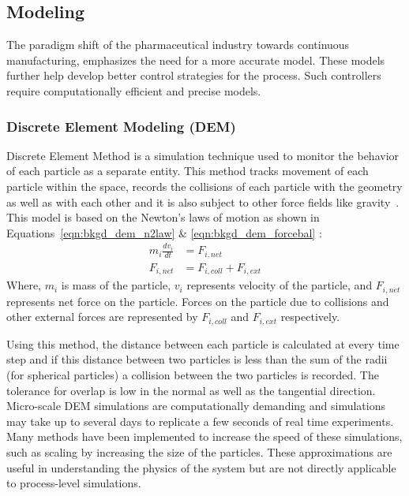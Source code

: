 \documentclass[preprint,11pt,authoryear]{elsarticle}
\begin{document}
\subsection{Modeling}
The paradigm shift of the pharmaceutical industry towards continuous 
manufacturing, emphasizes the need for a more accurate model. These models
further help develop better control strategies for the process. 
Such controllers require computationally efficient and precise models. 

\subsubsection{Discrete Element Modeling (DEM)}
Discrete Element Method is a simulation technique used to monitor the
behavior of each particle as a separate entity. This method tracks 
movement of each particle within the space, records the collisions 
of each particle with the geometry as well as with each other and it 
is also subject to other force fields like  gravity~\citep{Barrasso2015cerd}. 
This model is based on the Newton's laws of motion as shown in Equations~\ref{eqn:bkgd_dem_n2law} \&
\ref{eqn:bkgd_dem_forcebal} : \\
\begin{align}
m_i\frac{dv_i}{dt} &= F_{i,net} \label{eqn:bkgd_dem_n2law} \\
F_{i,net} &=  F_{i,coll} +  F_{i,ext} \label{eqn:bkgd_dem_forcebal}
\end{align}
Where, $m_i$ is mass of the particle, $v_i$ represents velocity of the
particle, and $F_{i,net}$ represents net force on the particle. Forces on the
particle due to collisions and other external forces are represented by
$F_{i,coll}$ and $F_{i,ext}$ respectively.

Using this method, the distance between each particle is calculated at every
time step and if this distance between two particles is less than the sum of
the radii (for spherical particles)  a collision between the two particles is
recorded. The tolerance for overlap is low in the normal as well as the
tangential direction. Micro-scale DEM simulations are computationally
demanding and simulations may take up to several days to replicate a few
seconds of real time experiments. Many methods have been implemented to
increase the speed of these simulations, such as scaling by increasing the
size of the particles. These approximations are useful in understanding the
physics of the system but are not directly applicable to process-level
simulations.
\end{document}
